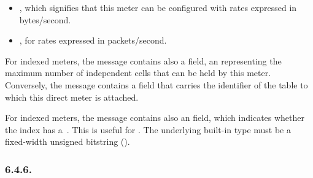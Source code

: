 \documentclass[11pt]{article}
\begin{document}
{\begin{itemize}
\begin{itemize}[noitemsep,topsep=\mdcompacttopsep]
\item{}, which signifies that this meter can be configured with rates
expressed in bytes/second.%

\item{}, for rates expressed in packets/second.%
\end{itemize}%
\end{itemize}%

\noindent{}For indexed meters, the  message contains also a  field, an 
representing the maximum number of independent cells that can be held by this
meter. Conversely, the  message contains a  field
that carries the  identifier of the table to which this direct meter is
attached.%

For indexed meters, the  message contains also an 
field, which indicates whether the index has a~. This is useful for
. The underlying built-in type must
be a fixed-width unsigned bitstring ().%

\subsubsection{6.4.6.\hspace*{0.5em}}\label{sec-controller-packet-meta}%

}
\end{document}
